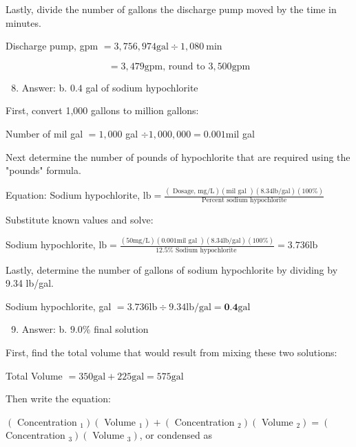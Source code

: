 \documentclass[10pt]{article}
\begin{document}
Lastly, divide the number of gallons the discharge pump moved by the time in minutes.

Discharge pump, gpm $=3,756,974 \mathrm{gal} \div 1,080 \mathrm{~min}$

$$
=3,479 \mathrm{gpm} \text {, round to } 3,500 \mathrm{gpm}
$$

\begin{enumerate}
  \setcounter{enumi}{7}
  \item Answer: b. $0.4$ gal of sodium hypochlorite
\end{enumerate}

First, convert 1,000 gallons to million gallons:

Number of mil gal $=1,000$ gal $\div 1,000,000=0.001 \mathrm{mil}$ gal

Next determine the number of pounds of hypochlorite that are required using the "pounds" formula.

Equation: Sodium hypochlorite, $\mathrm{lb}=\frac{(\text { Dosage, } \mathrm{mg} / \mathrm{L})(\mathrm{mil} \text { gal })(8.34 \mathrm{lb} / \mathrm{gal})(100 \%)}{\text { Percent sodium hypochlorite }}$

Substitute known values and solve:

Sodium hypochlorite, $\mathrm{lb}=\frac{(50 \mathrm{mg} / \mathrm{L})(0.001 \mathrm{mil} \text { gal })(8.34 \mathrm{lb} / \mathrm{gal})(100 \%)}{12.5 \% \text { Sodium hypochlorite }}=3.736 \mathrm{lb}$

Lastly, determine the number of gallons of sodium hypochlorite by dividing by 9.34 lb/gal.

Sodium hypochlorite, gal $=3.736 \mathrm{lb} \div 9.34 \mathrm{lb} / \mathrm{gal}=\mathbf{0 . 4} \mathrm{gal}$

\begin{enumerate}
  \setcounter{enumi}{8}
  \item Answer: b. $9.0 \%$ final solution
\end{enumerate}

First, find the total volume that would result from mixing these two solutions:

Total Volume $=350 \mathrm{gal}+225 \mathrm{gal}=575 \mathrm{gal}$

Then write the equation:

$\left(\right.$ Concentration $\left._{1}\right)\left(\right.$ Volume $\left._{1}\right)+\left(\right.$ Concentration $\left._{2}\right)\left(\right.$ Volume $\left._{2}\right)=\left(\right.$ Concentration $\left._{3}\right)\left(\right.$ Volume $\left._{3}\right)$, or condensed as
\end{document}
